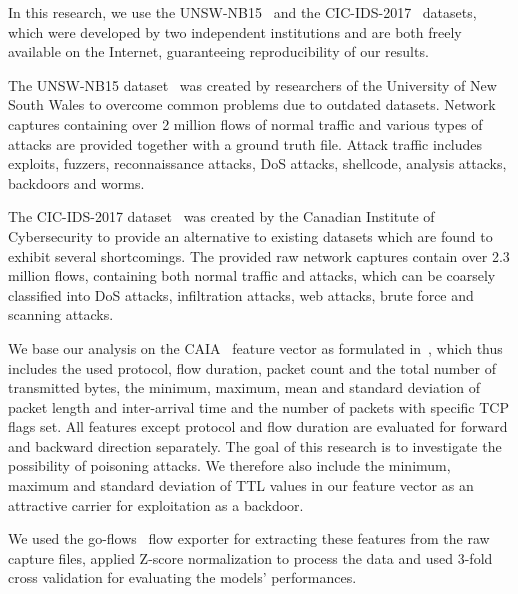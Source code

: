 \documentclass[10pt,sigconf,letterpaper,dvipsnames]{acmart}
\begin{document}
In this research, we use the UNSW-NB15~\cite{moustafa_unsw-nb15:_2015} and the CIC-IDS-2017~\cite{sharafaldin_toward_2018} datasets, which were developed by two independent institutions and are both freely available on the Internet, guaranteeing reproducibility of our results.

The UNSW-NB15 dataset~\cite{moustafa_unsw-nb15:_2015} was created by researchers of the University of New South Wales to overcome common problems due to outdated datasets. Network captures containing over 2 million flows of normal traffic and various types of attacks are provided together with a ground truth file. Attack traffic includes exploits, fuzzers, reconnaissance attacks, DoS attacks, shellcode, analysis attacks, backdoors and worms.

The CIC-IDS-2017 dataset~\cite{sharafaldin_toward_2018} was created by the Canadian Institute of Cybersecurity to provide an alternative to existing datasets which are found to exhibit several shortcomings. The provided raw network captures contain over 2.3 million flows, containing both normal traffic and attacks, which can be coarsely classified into DoS attacks, infiltration attacks, web attacks, brute force and scanning attacks.

We base our analysis on the CAIA~\cite{williams_preliminary_2006} feature vector as formulated in~\cite{meghdouri_analysis_2018}, which thus includes the used protocol, flow duration, packet count and the total number of transmitted bytes, the minimum, maximum, mean and standard deviation of packet length and inter-arrival time and the number of packets with specific TCP flags set. All features except protocol and flow duration are evaluated for forward and backward direction separately. The goal of this research is to investigate the possibility of poisoning attacks. We therefore also include the minimum, maximum and standard deviation of TTL values in our feature vector as an attractive carrier for exploitation as a backdoor. %

We used the go-flows~\cite{vormayr_cn-tu/go-flows_2019} flow exporter for extracting these features from the raw capture files, applied Z-score normalization to process the data and used 3-fold cross validation for evaluating the models' performances. 
\end{document}
